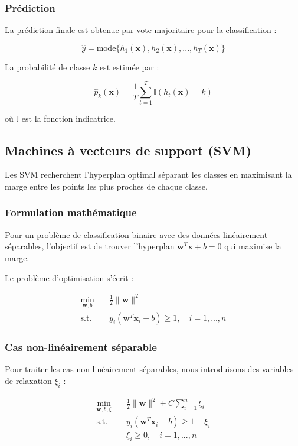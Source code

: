 \subsubsection{Prédiction}
La prédiction finale est obtenue par vote majoritaire pour la classification :

\begin{equation}
    \hat{y} = \text{mode}\{h_1(\mathbf{x}), h_2(\mathbf{x}), ..., h_T(\mathbf{x})\}
\end{equation}

La probabilité de classe $k$ est estimée par :

\begin{equation}
    \hat{p}_k(\mathbf{x}) = \frac{1}{T}\sum_{t=1}^{T} \mathbb{I}(h_t(\mathbf{x}) = k)
\end{equation}

où $\mathbb{I}$ est la fonction indicatrice.

\subsection{Machines à vecteurs de support (SVM)}

Les SVM recherchent l'hyperplan optimal séparant les classes en maximisant la marge entre les points les plus proches de chaque classe.

\subsubsection{Formulation mathématique}
Pour un problème de classification binaire avec des données linéairement séparables, l'objectif est de trouver l'hyperplan $\mathbf{w}^T\mathbf{x} + b = 0$ qui maximise la marge.

Le problème d'optimisation s'écrit :

\begin{align}
    \min_{\mathbf{w},b} &\quad \frac{1}{2}\|\mathbf{w}\|^2 \\
    \text{s.t.} &\quad y_i(\mathbf{w}^T\mathbf{x}_i + b) \geq 1, \quad i = 1, ..., n
\end{align}

\subsubsection{Cas non-linéairement séparable}
Pour traiter les cas non-linéairement séparables, nous introduisons des variables de relaxation $\xi_i$ :

\begin{align}
    \min_{\mathbf{w},b,\xi} &\quad \frac{1}{2}\|\mathbf{w}\|^2 + C\sum_{i=1}^{n}\xi_i \\
    \text{s.t.} &\quad y_i(\mathbf{w}^T\mathbf{x}_i + b) \geq 1 - \xi_i \\
    &\quad \xi_i \geq 0, \quad i = 1, ..., n
\end{align}

